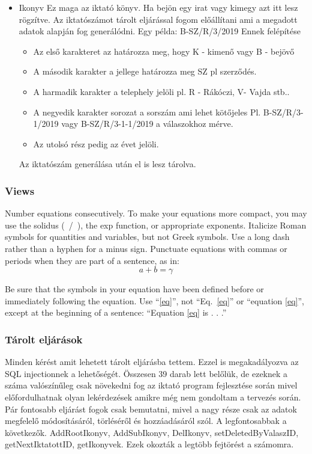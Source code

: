 \documentclass[conference]{IEEEtran}
\begin{document}
\begin{itemize}
	\item Ikonyv
	Ez maga az iktató könyv. Ha bejön egy irat vagy kimegy azt itt lesz rögzítve. Az iktatószámot tárolt eljárással fogom előállítani ami a megadott adatok alapján fog generálódni. Egy példa: B-SZ/R/3/2019 Ennek felépítése
	\begin{itemize}
		\item Az első karakteret az határozza meg, hogy K - kimenő vagy B - bejövő
		\item A második karakter a jellege határozza meg SZ pl szerződés.
		\item A harmadik karakter a telephely jelöli pl. R - Rákóczi, V- Vajda stb..
		\item A negyedik karakter sorozat a sorszám ami lehet kötőjeles Pl. B-SZ/R/3-1/2019 vagy B-SZ/R/3-1-1/2019 a válaszokhoz mérve.
		\item Az utolsó rész pedig az évet jelöli.
		
	\end{itemize}
	Az iktatószám generálása után el is lesz tárolva.
	
\end{itemize}
\subsubsection{\textbf{Views}}
Number equations consecutively. To make your 
equations more compact, you may use the solidus (~/~), the exp function, or 
appropriate exponents. Italicize Roman symbols for quantities and variables, 
but not Greek symbols. Use a long dash rather than a hyphen for a minus 
sign. Punctuate equations with commas or periods when they are part of a 
sentence, as in:
\begin{equation}
a+b=\gamma\label{eq}
\end{equation}

Be sure that the 
symbols in your equation have been defined before or immediately following 
the equation. Use ``\eqref{eq}'', not ``Eq.~\eqref{eq}'' or ``equation \eqref{eq}'', except at 
the beginning of a sentence: ``Equation \eqref{eq} is . . .''

\subsubsection{\textbf{Tárolt eljárások}}

Minden kérést amit lehetett tárolt eljárásba tettem. Ezzel is megakadályozva az SQL injectionnek a lehetőségét. Összesen 39 darab lett belőlük, de ezeknek a száma valószínűleg csak növekedni fog az iktató program fejlesztése során mivel előfordulhatnak olyan lekérdezések amikre még nem gondoltam a tervezés során.
Pár fontosabb eljárást fogok csak bemutatni, mivel a nagy része csak az adatok megfelelő módosításáról, törléséről és hozzáadásáról szól. A legfontosabbak a következők.
AddRootIkonyv, AddSubIkonyv, DelIkonyv, setDeletedByValaszID, getNextIktatottID, getIkonyvek. Ezek okozták a legtöbb fejtörést a számomra.
 
\end{document}
